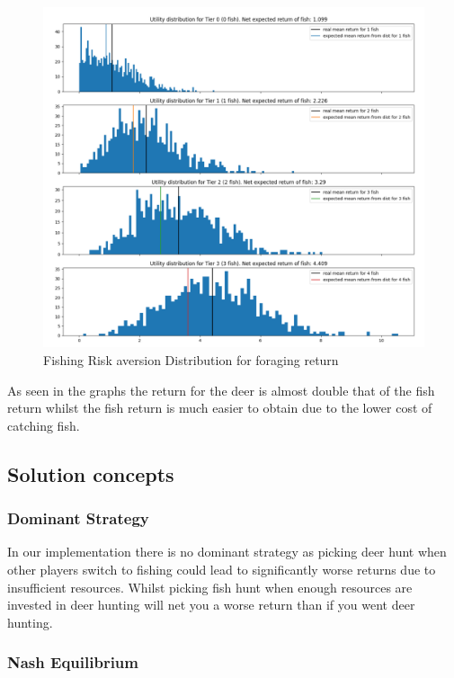 \begin{figure}[!htb]
    \centering
    \includegraphics[width=1\textwidth]{04_environment/Images/Distribution of Foraging returns Fishing.PNG}
    \caption{Fishing Risk aversion Distribution for foraging return}
    \label{Images:Distribution of Foraging returns Fishing}
\end{figure}

As seen in the graphs the return for the deer is almost double that of the fish return whilst the fish return is much easier to obtain due to the lower cost of catching fish. \\

\newpage
\subsection{Solution concepts}
\subsubsection{Dominant Strategy}

In our implementation there is no dominant strategy as picking deer hunt when other players switch to fishing could lead to significantly worse returns due to insufficient resources. Whilst picking fish hunt when enough resources are invested in deer hunting will net you a worse return than if you went deer hunting.\\

\subsubsection{Nash Equilibrium}

